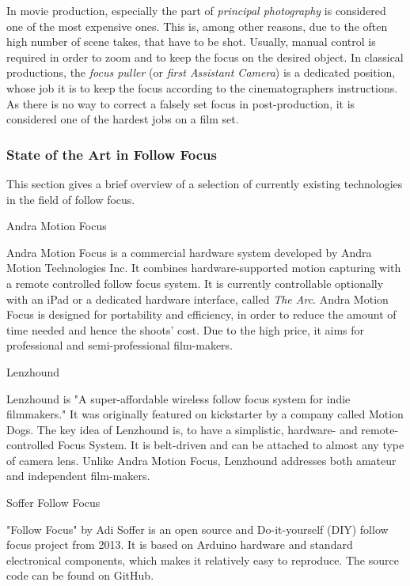 \documentclass{sigchi}
\begin{document}
In movie production, especially the part of \textit{principal photography} is considered one of the most expensive ones. This is, among other reasons, due to the often high number of scene takes, that have to be shot. \cite{kcrabb}
Usually, manual control is required in order to zoom and to keep the focus on the desired object. In classical productions, the \textit{focus puller} (or \textit{first Assistant Camera}) is a dedicated position, whose job it is to keep the focus according to the cinematographers instructions. As there is no way to correct a falsely set focus in post-production, it is considered one of the hardest jobs on a film set. \cite{cineman}

\subsubsection{State of the Art in Follow Focus}

This section gives a brief overview of a selection of currently existing technologies in the field of follow focus. 

Andra Motion Focus

Andra Motion Focus is a commercial hardware system developed by Andra Motion Technologies Inc. It combines hardware-supported motion capturing with a remote controlled follow focus system. It is currently controllable optionally with an iPad or a dedicated hardware interface, called \textit{The Arc}. Andra Motion Focus is designed for portability and efficiency, in order to reduce the amount of time needed and hence the shoots' cost. Due to the high price, it aims for professional and semi-professional film-makers. \cite{andra}

Lenzhound

Lenzhound is "A super-affordable wireless follow focus system for indie filmmakers." \cite{kicklenz} It was originally featured on kickstarter by a company called Motion Dogs. The key idea of Lenzhound is, to have a simplistic, hardware- and remote-controlled Focus System. It is belt-driven and can be attached to almost any type of camera lens. Unlike Andra Motion Focus, Lenzhound addresses both amateur and independent film-makers. 

Soffer Follow Focus

"Follow Focus" by Adi Soffer is an open source and Do-it-yourself (DIY) follow focus project from 2013. It is based on Arduino hardware and standard electronical components, which makes it relatively easy to reproduce. The source code can be found on GitHub. \cite{soffer}
\end{document}
